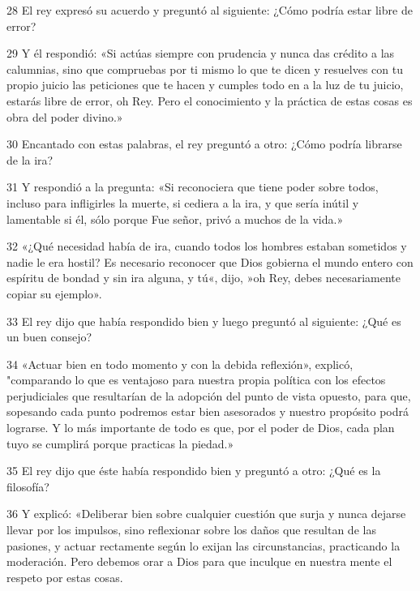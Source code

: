 \par 28 El rey expresó su acuerdo y preguntó al siguiente: ¿Cómo podría estar libre de error?

\par 29 Y él respondió: «Si actúas siempre con prudencia y nunca das crédito a las calumnias, sino que compruebas por ti mismo lo que te dicen y resuelves con tu propio juicio las peticiones que te hacen y cumples todo en a la luz de tu juicio, estarás libre de error, oh Rey. Pero el conocimiento y la práctica de estas cosas es obra del poder divino.»

\par 30 Encantado con estas palabras, el rey preguntó a otro: ¿Cómo podría librarse de la ira?

\par 31 Y respondió a la pregunta: «Si reconociera que tiene poder sobre todos, incluso para infligirles la muerte, si cediera a la ira, y que sería inútil y lamentable si él, sólo porque Fue señor, privó a muchos de la vida.»

\par 32 «¿Qué necesidad había de ira, cuando todos los hombres estaban sometidos y nadie le era hostil? Es necesario reconocer que Dios gobierna el mundo entero con espíritu de bondad y sin ira alguna, y tú«, dijo, »oh Rey, debes necesariamente copiar su ejemplo».

\par 33 El rey dijo que había respondido bien y luego preguntó al siguiente: ¿Qué es un buen consejo?

\par 34 «Actuar bien en todo momento y con la debida reflexión», explicó, "comparando lo que es ventajoso para nuestra propia política con los efectos perjudiciales que resultarían de la adopción del punto de vista opuesto, para que, sopesando cada punto podremos estar bien asesorados y nuestro propósito podrá lograrse. Y lo más importante de todo es que, por el poder de Dios, cada plan tuyo se cumplirá porque practicas la piedad.»

\par 35 El rey dijo que éste había respondido bien y preguntó a otro: ¿Qué es la filosofía?

\par 36 Y explicó: «Deliberar bien sobre cualquier cuestión que surja y nunca dejarse llevar por los impulsos, sino reflexionar sobre los daños que resultan de las pasiones, y actuar rectamente según lo exijan las circunstancias, practicando la moderación. Pero debemos orar a Dios para que inculque en nuestra mente el respeto por estas cosas.

